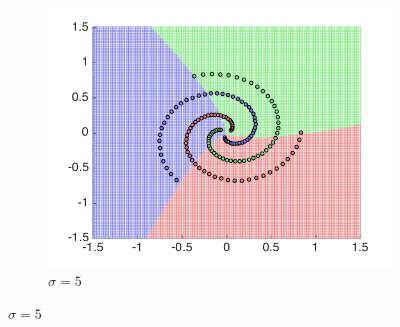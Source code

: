 \documentclass[10pt,twocolumn,letterpaper]{article}
\begin{document}
\begin{figure}
\begin{subfigure}[H]{0.3 \columnwidth}
	\includegraphics[width = 1\columnwidth]{q2_ovr_sig5}
	\caption{$\sigma = 5$}
\end{subfigure}


\end{figure}
\end{document}

